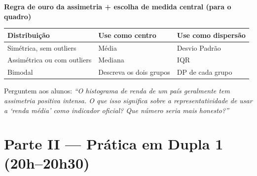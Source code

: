 \begin{BoardBox}
\textbf{Regra de ouro da assimetria + escolha de medida central (para o quadro)}
\begin{tabular}{|l|l|l|}
\hline
\textbf{Distribuição} & \textbf{Use como centro} & \textbf{Use como dispersão} \\
\hline
Simétrica, sem outliers & Média & Desvio Padrão \\
Assimétrica ou com outliers & Mediana & IQR \\
Bimodal & Descreva os dois grupos & DP de cada grupo \\
\hline
\end{tabular}
\end{BoardBox}

Perguntem aos alunos: \textit{``O histograma de renda de um país geralmente
tem assimetria positiva intensa. O que isso significa sobre a representatividade
de usar a `renda média' como indicador oficial? Que número seria mais honesto?''}

\section{Parte II — Prática em Dupla 1 (20h–20h30)}


